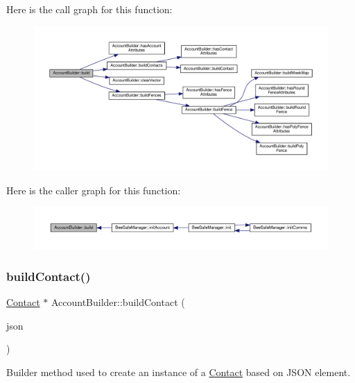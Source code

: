 Here is the call graph for this function\+:\nopagebreak
\begin{figure}[H]
\begin{center}
\leavevmode
\includegraphics[width=350pt]{d9/daa/class_account_builder_af44cc9897467096f65d3bd768fd01300_cgraph}
\end{center}
\end{figure}
Here is the caller graph for this function\+:\nopagebreak
\begin{figure}[H]
\begin{center}
\leavevmode
\includegraphics[width=350pt]{d9/daa/class_account_builder_af44cc9897467096f65d3bd768fd01300_icgraph}
\end{center}
\end{figure}
\mbox{\label{class_account_builder_a3a3cc8d8beb8af6c0a9feb79e28adb59}} 
\subsubsection{\texorpdfstring{build\+Contact()}{buildContact()}}
{\footnotesize\ttfamily \hyperlink{class_contact}{Contact} $\ast$ Account\+Builder\+::build\+Contact (\begin{DoxyParamCaption}\item[{const web\+::json\+::value \&}]{json }\end{DoxyParamCaption})\hspace{0.3cm}{\ttfamily [private]}}

Builder method used to create an instance of a \hyperlink{class_contact}{Contact} based on J\+S\+ON element.


